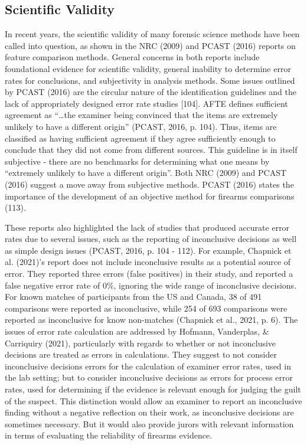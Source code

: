 \documentclass[print]{nuthesis}
\begin{document}
\hypertarget{scientific-validity}{%
\subsection{Scientific Validity}\label{scientific-validity}}

In recent years, the scientific validity of many forensic science methods have been called into question, as shown in the NRC (2009) and PCAST (2016) reports on feature comparison methods.
General concerns in both reports include foundational evidence for scientific validity, general inability to determine error rates for conclusions, and subjectivity in analysis methods.
Some issues outlined by PCAST (2016) are the circular nature of the identification guidelines  and the lack of appropriately designed error rate studies {[}104{]}.
AFTE defines sufficient agreement as ``\ldots the examiner being convinced that the items are extremely unlikely to have a different origin'' (PCAST, 2016, p. 104).
Thus, items are classified as having sufficient agreement if they agree sufficiently enough to conclude that they did not come from different sources.
This guideline is in itself subjective - there are no benchmarks for determining what one means by ``extremely unlikely to have a different origin''.
Both NRC (2009) and PCAST (2016) suggest a move away from subjective methods.
PCAST (2016) states the importance of the development of an objective method for firearms comparisons (113).

These reports also highlighted the lack of studies that produced accurate error rates due to several issues, such as the reporting of inconclusive decisions as well as simple design issues (PCAST, 2016, p. 104 - 112).
For example, Chapnick et al. (2021)'s report does not include inconclusive results as a potential source of error.
They reported three errors (false positives) in their study, and reported a false negative error rate of 0\%, ignoring the wide range of inconclusive decisions.
For known matches of participants from the US and Canada, 38 of 491 comparisons were reported as inconclusive, while 254 of 693 comparisons were reported as inconclusive for know non-matches (Chapnick et al., 2021, p. 6).
The issues of error rate calculation are addressed by Hofmann, Vanderplas, \& Carriquiry (2021), particularly with regards to whether or not inconclusive decisions are treated as errors in calculations.
They suggest to not consider inconclusive decisions errors for the calculation of examiner error rates, used in the lab setting; but to consider inconclusive decisions as errors for process error rates, used for determining if the evidence is relevant enough for judging the guilt of the suspect.
This distinction would allow an examiner to report an inconclusive finding without a negative reflection on their work, as inconclusive decisions are sometimes necessary.
But it would also provide jurors with relevant information in terms of evaluating the reliability of firearms evidence.
\end{document}
